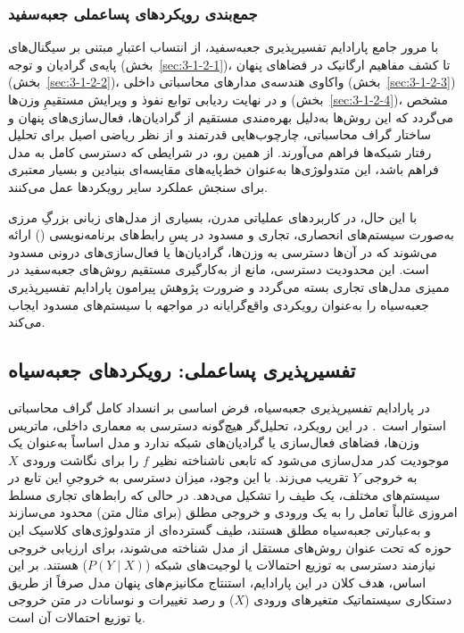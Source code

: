 \subsubsection{جمع‌بندی رویکردهای پساعملی جعبه‌سفید}\label{sec:3-1-2-5}

با مرور جامع پارادایم تفسیرپذیری جعبه‌سفید، از انتساب اعتبارِ مبتنی بر سیگنال‌های پایه‌ی گرادیان و توجه (بخش~\ref{sec:3-1-2-1})، تا کشف مفاهیم ارگانیک در فضاهای پنهان (بخش~\ref{sec:3-1-2-2})، واکاوی هندسه‌ی مدارهای محاسباتی داخلی (بخش~\ref{sec:3-1-2-3}) و در نهایت ردیابی توابع نفوذ و ویرایش مستقیمِ وزن‌ها (بخش~\ref{sec:3-1-2-4})، مشخص می‌گردد که این روش‌ها به‌دلیل بهره‌مندی مستقیم از گرادیان‌ها، فعال‌سازی‌های پنهان و ساختار گراف محاسباتی، چارچوب‌هایی قدرتمند و از نظر ریاضی اصیل برای تحلیل رفتار شبکه‌ها فراهم می‌آورند. از همین رو، در شرایطی که دسترسی کامل به مدل فراهم باشد، این متدولوژی‌ها به‌عنوان خط‌پایه‌های مقایسه‌ای بنیادین و بسیار معتبری برای سنجش عملکرد سایر رویکردها عمل می‌کنند. 

با این حال، در کاربردهای عملیاتی مدرن، بسیاری از مدل‌های زبانی بزرگِ مرزی به‌صورت سیستم‌های انحصاری، تجاری و مسدود در پسِ رابط‌های برنامه‌نویسی () ارائه می‌شوند که در آن‌ها دسترسی به وزن‌ها، گرادیان‌ها یا فعال‌سازی‌های درونی مسدود است. این محدودیت دسترسی، مانع از به‌کارگیری مستقیم روش‌های جعبه‌سفید در ممیزی مدل‌های تجاری بسته می‌گردد و ضرورت پژوهش پیرامون پارادایم تفسیرپذیری جعبه‌سیاه را به‌عنوان رویکردی واقع‌گرایانه در مواجهه با سیستم‌های مسدود ایجاب می‌کند.


\subsection{تفسیرپذیری پساعملی: رویکردهای جعبه‌سیاه}\label{sec:3-1-3}

در پارادایم تفسیرپذیری جعبه‌سیاه، فرض اساسی بر انسداد کامل گراف محاسباتی استوار است~\cite{guidotti2018survey}. در این رویکرد، تحلیل‌گر هیچ‌گونه دسترسی به معماری داخلی، ماتریس وزن‌ها، فضاهای فعال‌سازی یا گرادیان‌های شبکه ندارد و مدل اساساً به‌عنوان یک موجودیت کدر مدل‌سازی می‌شود که تابعی ناشناخته نظیر $f$ را برای نگاشت ورودی $X$ به خروجی $Y$ تقریب می‌زند. با این وجود، میزان دسترسی به خروجیِ این تابع در سیستم‌های مختلف، یک طیف را تشکیل می‌دهد. در حالی که رابط‌های تجاری مسلط امروزی غالباً تعامل را به یک ورودی و خروجی مطلق (برای مثال متن) محدود می‌سازند و به‌عبارتی جعبه‌سیاه مطلق هستند، طیف گسترده‌ای از متدولوژی‌های کلاسیک این حوزه که تحت عنوان روش‌های مستقل از مدل شناخته می‌شوند، برای ارزیابی خروجی نیازمند دسترسی به توزیع احتمالات یا لوجیت‌های شبکه ($P(Y \mid X)$) هستند. بر این اساس، هدف کلان در این پارادایم، استنتاج مکانیزم‌های پنهان مدل صرفاً از طریق دستکاری سیستماتیک متغیرهای ورودی ($X$) و رصد تغییرات و نوسانات در متن خروجی یا توزیع احتمالات آن است.

